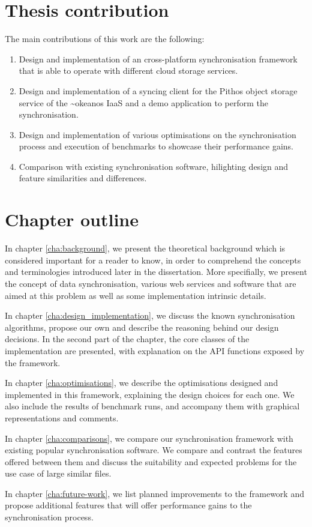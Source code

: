 \section{Thesis contribution}
  The main contributions of this work are the following:
  \begin{enumerate}
    \item Design and implementation of an cross-platform synchronisation framework that is able to operate with different cloud storage services.
    \item Design and implementation of a syncing client for the Pithos object storage service of the \textasciitilde okeanos IaaS and a demo application to perform the synchronisation.
    \item Design and implementation of various optimisations on the synchronisation process and execution of benchmarks to showcase their performance gains.
    \item Comparison with existing synchronisation software, hilighting design and feature similarities and differences.
  \end{enumerate}

\section{Chapter outline}
  In chapter \ref{cha:background}, we present the theoretical background which is considered important for a reader to know, in order to comprehend the concepts and terminologies introduced later in the dissertation. More specifially, we present the concept of data synchronisation, various web services and software that are aimed at this problem as well as some implementation intrinsic details.

  In chapter \ref{cha:design_implementation}, we discuss the known synchronisation algorithms, propose our own and describe the reasoning behind our design decisions. In the second part of the chapter, the core classes of the implementation are presented, with explanation on the API functions exposed by the framework.

  In chapter \ref{cha:optimisations}, we describe the optimisations designed and implemented in this framework, explaining the design choices for each one. We also include the results of benchmark runs, and accompany them with graphical representations and comments.

  In chapter \ref{cha:comparisons}, we compare our synchronisation framework with existing popular synchronisation software. We compare and contrast the features offered between them and discuss the suitability and expected problems for the use case of large similar files.

  In chapter \ref{cha:future-work}, we list planned improvements to the framework and propose additional features that will offer performance gains to the synchronisation process.
